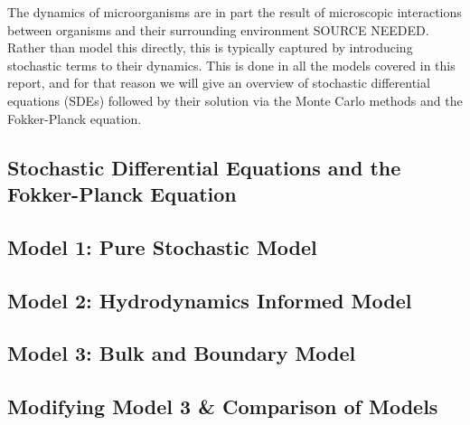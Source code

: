 The dynamics of microorganisms are in part the result of microscopic interactions between organisms and their
surrounding environment SOURCE NEEDED. Rather than model this directly, this is typically captured by introducing
stochastic terms to their dynamics. This is done in all the models covered in this report, and for that reason we will give an 
overview of stochastic differential equations (SDEs) followed by their solution via the Monte Carlo methods and the
Fokker-Planck equation.

\subsection{Stochastic Differential Equations and the Fokker-Planck Equation}


\subsection{Model 1: Pure Stochastic Model}\label{sec:pure_stoch_model}


\subsection{Model 2: Hydrodynamics Informed Model}\label{sec:hydrodynamic_model}


\subsection{Model 3: Bulk and Boundary Model}\label{sec:bulk_and_boundary_model}


\subsection{Modifying Model 3 \& Comparison of Models}


